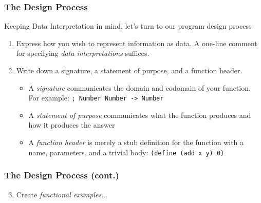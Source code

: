 \documentclass{beamer}
\begin{document}
\begin{frame}
  \frametitle{The Design Process}
  Keeping Data Interpretation in mind, let's turn to our program design process
  \begin{enumerate}
  \item<2-> Express how you wish to represent information as data. A one-line comment for specifying \emph{data interpretations} suffices.
  \item<3-> Write down a signature, a statement of purpose, and a function header.
    \begin{itemize}
    \item<4-> A \emph{signature} communicates the domain and codomain of your function. For example: \texttt{; Number Number -> Number}
    \item<5-> A \emph{statement of purpose} communicates what the function produces and how it produces the answer
    \item<6-> A \emph{function header} is merely a stub definition for the function with a name, parameters, and a trivial body: \texttt{(define (add x y) 0)}
    \end{itemize}    
  \end{enumerate}
\end{frame}

\begin{frame}
  \frametitle{The Design Process (cont.)}
  \begin{enumerate}
  \setcounter{enumi}{2}
  \item Create \emph{functional examples}...
\end{enumerate}
\end{frame}
\end{document}

